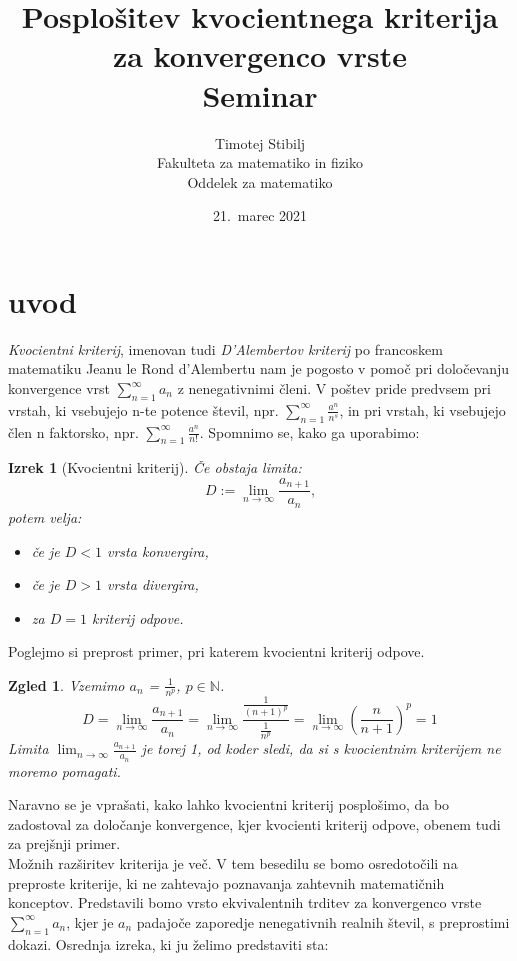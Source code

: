 \documentclass[a4paper,12pt]{article}
\title{Posplošitev kvocientnega kriterija za konvergenco vrste \\ 
\Large Seminar}
\author{Timotej Stibilj \\
Fakulteta za matematiko in fiziko \\
Oddelek za matematiko}
\date{21.\ marec 2021}
\def\N{\mathbb{N}} %
\newtheorem{izrek}{Izrek}
\newtheorem{zgled}{Zgled}
\begin{document}
\maketitle

\section{uvod}

\emph{Kvocientni kriterij}, imenovan tudi \emph{D'Alembertov kriterij} po francoskem matematiku Jeanu le Rond d'Alembertu
nam je pogosto v pomoč pri določevanju konvergence vrst $\sum_{n = 1}^{\infty}{a_n}$ z nenegativnimi členi. 
V poštev pride predvsem pri vrstah, ki vsebujejo n-te potence števil, npr. $\sum_{n = 1}^{\infty}{\frac{a^n}{n^s}}$, 
in pri vrstah, ki vsebujejo člen n faktorsko, npr. $\sum_{n = 1}^{\infty}{\frac{a^n}{n!}}$.
Spomnimo se, kako ga uporabimo:\\

\noindent
\begin{izrek}[Kvocientni kriterij]
    Če obstaja limita:
    \[
        D := \lim_{n \to \infty} \frac{a_{n + 1}}{a_n} \text{,}
    \]
    potem velja:
    \begin{itemize}
        \item če je $ D < 1 $ vrsta konvergira,
        \item če je $D > 1$ vrsta divergira,
        \item za $D = 1$ kriterij odpove.
    \end{itemize}
\end{izrek}

Poglejmo si preprost primer, pri katerem kvocientni kriterij odpove.

\begin{zgled}
    Vzemimo $a_n$ = $\frac{1}{n^p}$, $p \in \N$.
    \[
        D = \lim_{n \to \infty} \frac{a_{n + 1}}{a_n}
        = \lim_{n \to \infty} \frac{\frac{1}{(n+1)^p}}{\frac{1}{n^p}}
        = \lim_{n \to \infty} (\frac{n}{n + 1})^p
        = 1
    \]
    Limita $ \lim_{n \to \infty} \frac{a_{n + 1}}{a_n} $ je torej 1, od koder sledi, da si s kvocientnim kriterijem ne moremo pomagati.
\end{zgled}

Naravno se je vprašati, kako lahko kvocientni kriterij posplošimo, da bo zadostoval za določanje konvergence,
kjer kvocienti kriterij odpove, obenem tudi za prejšnji primer.\\
Možnih razširitev kriterija je več. V tem besedilu se bomo osredotočili na preproste kriterije, ki ne
zahtevajo poznavanja zahtevnih matematičnih konceptov. Predstavili bomo vrsto ekvivalentnih trditev
za konvergenco vrste $\sum_{n = 1}^{\infty}{a_n}$, kjer je ${a_n}$ padajoče zaporedje nenegativnih realnih števil, s preprostimi dokazi. Osrednja
izreka, ki ju želimo predstaviti sta:
\end{document}
